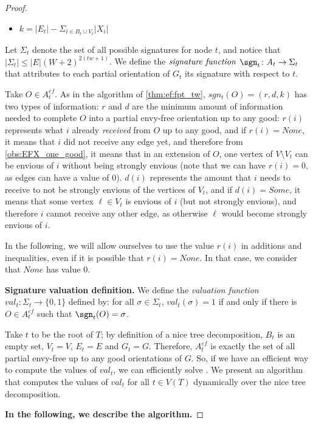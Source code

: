 \documentclass[11pt,letterpaper]{article}
\begin{document}
\begin{proof}
\begin{itemize}
        \item $k=|E_t|-\Sigma_{i\in B_t\cup V_t}|X_i|$
    \end{itemize}

    Let $\Sigma_t$ denote the set of all possible signatures for node $t$, and notice that $|\Sigma_t|\leq |E|(W+2)^{2(tw+1)}$. We define the $\emph{signature function}$ $\sgn_t\colon A_t\to \Sigma_t$ that attributes to each partial orientation of $G_t$ its signature with respect to $t$.

    Take $O\in A_t^{ef}$. As in the algorithm of \cref{thm:ef:fpt_tw}, $sgn_t(O)=(r,d,k)$ has two types of information: $r$ and $d$ are the minimum amount of information needed to complete $O$ into a partial envy-free orientation up to any good: $r(i)$ represents what $i$ already \emph{received} from $O$ up to any good, and if $r(i)=None$, it means that $i$ did not receive any edge yet, and therefore from \cref{obs:EFX_one_good}, it means that in an extension of $O$, one vertex of $V\setminus V_t$ can be envious of $i$ without being strongly envious (note that we can have $r(i)=0$, as edges can have a value of $0$). $d(i)$ represents the amount that $i$ needs to receive to not be strongly envious of the vertices of $V_t$, and if $d(i)=Some$, it means that some vertex $\ell\in V_t$ is envious of $i$ (but not strongly envious), and therefore $i$ cannot receive any other edge, as otherwise $\ell$ would become strongly envious of $i$.

    In the following, we will allow ourselves to use the value $r(i)$ in additions and inequalities, even if it is possible that $r(i)=None$. In that case, we consider that $None$ has value $0$.

    \textbf{Signature valuation definition.} We define the \emph{valuation function} $val_t\colon \Sigma_t\to \{0,1\}$ defined by: for all $\sigma\in \Sigma_t$, $val_t(\sigma)=1$ if and only if there is $O\in A_t^{ef}$ such that $\sgn_t(O)=\sigma$.

    Take $t$ to be the root of $T$; by definition of a nice tree decomposition, $B_t$ is an empty set, $V_t=V$, $E_t=E$ and $G_t=G$. Therefore, $A_t^{ef}$ is exactly the set of all partial envy-free up to any good orientations of $G$. So, if we have an efficient way to compute the values of $val_t$, we can efficiently solve \EFXmc. We present an algorithm that computes the values of $val_t$ for all $t\in V(T)$ dynamically over the nice tree decomposition.

    \textbf{In the following, we describe the algorithm.}


\end{proof}
\end{document}
